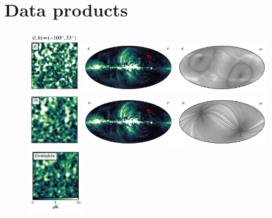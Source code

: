 \documentclass[twocolumn]{../../common/aa}
\begin{document}
\section{Data products}
\label{sec:data}

\begin{figure}
	\centering
	\includegraphics[width=0.2\textwidth]{figures/K_square.pdf}
	\includegraphics[width=0.35\textwidth]{figures/Kband_polint.pdf}
	\includegraphics[width=0.35\textwidth]{figures/Kband_sigmaP.pdf}\\
	\includegraphics[width=0.2\textwidth]{figures/30_square.pdf}
	\includegraphics[width=0.35\textwidth]{figures/30GHz_polint.pdf}
	\includegraphics[width=0.35\textwidth]{figures/30GHz_sigmaP.pdf}\\
	\includegraphics[width=0.212\textwidth]{figures/CG_square.pdf}

\end{figure}
\end{document}
